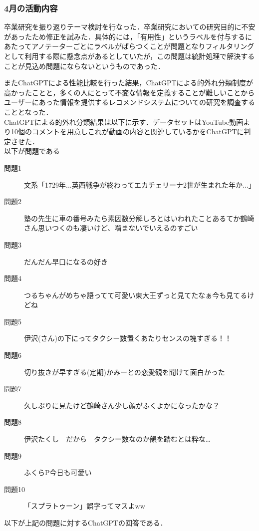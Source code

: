 \documentclass[platex,dvipdfmx,a4paper,twocolumn,base=10.5pt,jbase=10.5pt,ja=standard]{bxjsarticle}
\begin{document}
\subsubsection{4月の活動内容}
卒業研究を振り返りテーマ検討を行なった．卒業研究においての研究目的に不安があったため修正を試みた．具体的には，「有用性」というラベルを付与するにあたってアノテーターごとにラベルがばらつくことが問題となりフィルタリングとして利用する際に懸念点があるとしていたが，この問題は統計処理で解決することが見込め問題にならないというものであった．\par
またChatGPTによる性能比較を行った結果，ChatGPTによる的外れ分類制度が高かったことと，多くの人にとって不変な情報を定義することが難しいことからユーザーにあった情報を提供するレコメンドシステムについての研究を調査することとなった．\\
ChatGPTによる的外れ分類結果は以下に示す．データセットはYouTube動画\cite{source2}より10個のコメントを用意しこれが動画の内容と関連しているかをChatGPTに判定させた．\\
以下が問題である\\
\begin{description}
   \item[問題1] 文系「1729年...英西戦争が終わってエカチェリーナ2世が生まれた年か...」
   \item[問題2] 塾の先生に車の番号みたら素因数分解しろとはいわれたことあるてか鶴崎さん思いつくのも凄いけど、噛まないでいえるのすごい
   \item[問題3]だんだん早口になるの好き
   \item[問題4]つるちゃんがめちゃ語ってて可愛い東大王ずっと見てたなぁ今も見てるけどね
   \item[問題5]伊沢(さん)の下にってタクシー数置くあたりセンスの塊すぎる！！
   \item[問題6]切り抜きが早すぎる(定期)かみーとの恋愛観を聞けて面白かった
   \item[問題7]久しぶりに見たけど鶴崎さん少し顔がふくよかになったかな？
   \item[問題8]伊沢たくし　だから　タクシー数なのか韻を踏むとは粋な…
   \item[問題9]ふくらP今日も可愛い
   \item[問題10]「スプラトゥーン」誤字ってマスよww
\end{description}
以下が上記の問題に対するChatGPTの回答である．\\
\end{document}
